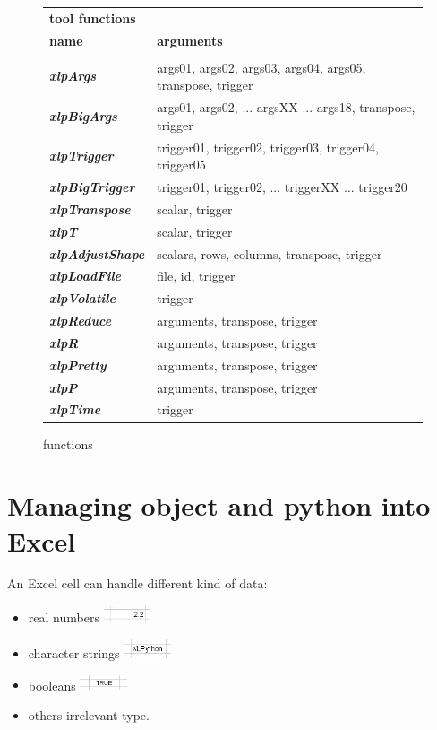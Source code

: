 \begin{figure}
\begin{minipage}[t]{.80\linewidth}
\begin{tabular}{ll}
\multicolumn{2}{l}{\textbf{\textcolor{mred}{tool functions}}} \\
\textbf{\textcolor{mblue}{name}} & \textbf{\textcolor{mblue}{arguments}}  \\
\hline\\
{\sl \bf xlpArgs} &  args01, args02, args03, args04, args05, transpose, trigger \\
{\sl \bf xlpBigArgs} &  args01, args02, ... argsXX ... args18, transpose, trigger \\
{\sl \bf xlpTrigger} &  trigger01, trigger02, trigger03, trigger04, trigger05\\
{\sl \bf xlpBigTrigger} &  trigger01, trigger02, ... triggerXX ... trigger20\\
{\sl \bf xlpTranspose} & scalar, trigger \\
{\sl \bf xlpT} & scalar, trigger \\
{\sl \bf xlpAdjustShape} & scalars, rows, columns, transpose, trigger \\
{\sl \bf xlpLoadFile} & file, id, trigger \\
{\sl \bf xlpVolatile} & trigger \\
{\sl \bf xlpReduce} & arguments, transpose, trigger \\
{\sl \bf xlpR} & arguments, transpose, trigger \\
{\sl \bf xlpPretty} & arguments, transpose, trigger \\
{\sl \bf xlpP} & arguments, transpose, trigger \\
{\sl \bf xlpTime} & trigger \\
\end{tabular}
\end{minipage}
\caption{\xlp functions}
\end{figure}

\section{Managing object and python into Excel}

An Excel cell can handle different kind of data: 

\begin{itemize}
\item real numbers \includegraphics[width=1.4cm]{images/real.jpg}
\item character strings \includegraphics[width=1.4cm]{images/string.jpg}
\item booleans \includegraphics[width=1.4cm]{images/bool.jpg}
\item others irrelevant type.
\end{itemize}


